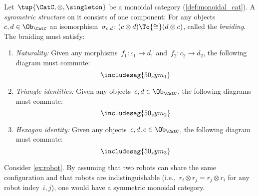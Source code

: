 \begin{shaded}
\begin{definition}
Let~$\tup{\CatC,\otimes,\singleton}$ be a monoidal category (\cref{def:monoidal_cat}). A \emph{symmetric structure} on it consists of one component: For any objects~$c,d\in\Ob_\CatC$ an isomorphism~$\sigma_{c,d}\colon (c\otimes d)\To{\cong}(d\otimes c)$, called the \emph{braiding}. The braiding must satisfy:
\begin{enumerate}
	\item \emph{Naturality:} Given any morphisms~$f_1\colon c_1\to d_1$ and~$f_2\colon c_2\to d_2$, the following diagram must commute:
	\begin{equation}
	\includesag{50_sym_1}
	\end{equation}
	\item \emph{Triangle identities:} Given any objects~$c,d\in\Ob_\CatC$, the following diagrams must commute:
\begin{equation}
	\includesag{50_sym_2}
\end{equation}
\item \emph{Hexagon identity:} Given any objects~$c,d,e\in \Ob_\CatC$, the following diagram must commute:
\begin{equation}
    \includesag{50_sym_3}
\end{equation}
\end{enumerate}
\end{definition}
\end{shaded}

\begin{example}
\label{ex:robot_2}
Consider \cref{ex:robot}. By assuming that two robots can share the same configuration and that robots are indistinguishable (i.e.,~$r_i\otimes r_j=r_j\otimes r_i$ for any robot indey~$i,j$), one would have a symmetric monoidal category.
\end{example}

